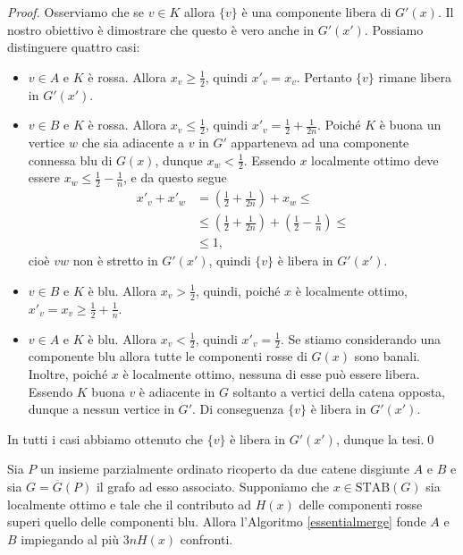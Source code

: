 \begin{proof}
  Osserviamo che se \(v\in K\) allora \(\{v\}\) \`e una componente libera di \(G'(x)\). Il nostro obiettivo \`e dimostrare che questo \`e vero anche in \(G'(x')\). Possiamo distinguere quattro casi: 
  \begin{itemize}
  \item \(v\in A\) e \(K\) \`e rossa. Allora \(x_v\ge\frac{1}{2}\), quindi \(x'_v=x_v\). Pertanto \(\{v\}\) rimane libera in \(G'(x')\). 
  \item \(v\in B\) e \(K\) \`e rossa. Allora \(x_v\le\frac{1}{2}\), quindi \(x'_v=\frac{1}{2}+\frac{1}{2n}\). Poich\'e \(K\) \`e buona un vertice \(w\) che sia adiacente a \(v\) in \(G'\) apparteneva ad una componente connessa blu di \(G(x)\), dunque \(x_w<\frac{1}{2}\). Essendo \(x\) localmente ottimo deve essere \(x_w\le\frac{1}{2}-\frac{1}{n}\), e da questo segue 
    \begin{align}
      x'_v+x'_w &= (\frac{1}{2} + \frac{1}{2n}) + x_w \le \nonumber \\
      &\le (\frac{1}{2} + \frac{1}{2n}) + (\frac{1}{2} - \frac{1}{n}) \le \nonumber \\
      &\le 1\text{,} \nonumber 
    \end{align}
    cio\`e \(vw\) non \`e stretto in \(G'(x')\), quindi \(\{v\}\) \`e libera in \(G'(x')\). 
  \item \(v\in B\) e \(K\) \`e blu. Allora \(x_v>\frac{1}{2}\), quindi, poich\'e \(x\) \`e localmente ottimo, \(x'_v=x_v\ge\frac{1}{2}+\frac{1}{n}\). 
  \item \(v\in A\) e \(K\) \`e blu. Allora \(x_v<\frac{1}{2}\), quindi \(x'_v=\frac{1}{2}\). Se stiamo considerando una componente blu allora tutte le componenti rosse di \(G(x)\) sono banali. Inoltre, poich\'e \(x\) \`e localmente ottimo, nessuna di esse pu\`o essere libera. Essendo \(K\) buona \(v\) \`e adiacente in \(G\) soltanto a vertici della catena opposta, dunque a nessun vertice in \(G'\). Di conseguenza \(\{v\}\) \`e libera in \(G'(x')\). 
  \end{itemize}
  In tutti i casi abbiamo ottenuto che \(\{v\}\) è libera in \(G'(x')\), dunque la tesi.\qed 
\end{proof}
\begin{lemma}
  \label{finallemma} Sia \(P\) un insieme parzialmente ordinato ricoperto da due catene disgiunte \(A\) e \(B\) e sia \(G=\overline{G}(P)\) il grafo ad esso associato. Supponiamo che \(x\in\text{STAB}(G)\) sia localmente ottimo e tale che il contributo ad \(H(x)\) delle componenti rosse superi quello delle componenti blu. Allora l'Algoritmo \ref{essentialmerge} fonde \(A\) e \(B\) impiegando al pi\`u \(3nH(x)\) confronti. 
\end{lemma}
